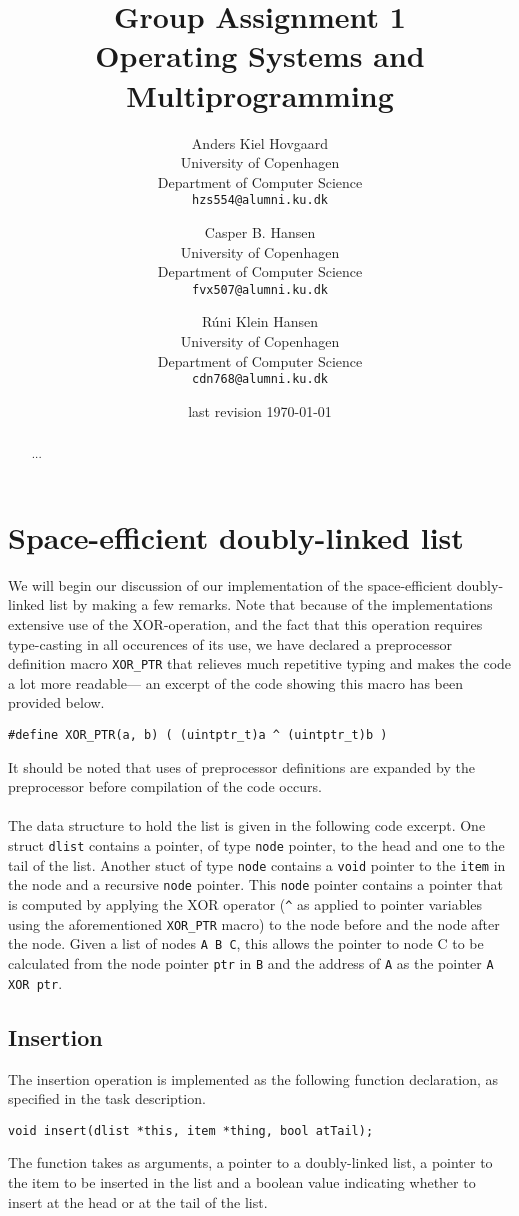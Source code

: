 \documentclass[11pt]{article}
\title
{
    {\Large Group Assignment 1} \\
    Operating Systems and Multiprogramming
}
\author
{
    Anders Kiel Hovgaard \\
    University of Copenhagen \\
    Department of Computer Science \\
    {\tt hzs554@alumni.ku.dk}
    \and
    Casper B. Hansen \\
    University of Copenhagen \\
    Department of Computer Science \\
    {\tt fvx507@alumni.ku.dk}
    \and
    Rúni Klein Hansen \\
    University of Copenhagen \\
    Department of Computer Science \\
    {\tt cdn768@alumni.ku.dk}
}
\date{last revision \today}
\newcommand{\code}[1]{{\tt #1}}
\begin{document}
\clearpage
\maketitle
\thispagestyle{empty}
\begin{multicols}{2}
    \begin{abstract}
    ...
    \end{abstract}
    \vfill\columnbreak
    \tableofcontents\vfill
\end{multicols}
\newpage

\section{Space-efficient doubly-linked list}
We will begin our discussion of our implementation of the space-efficient
doubly-linked list by making a few remarks. Note that because of the
implementations extensive use of the XOR-operation, and the fact that this
operation requires type-casting in all occurences of its use, we have declared
a preprocessor definition macro \code{XOR\_PTR} that relieves much repetitive
typing and makes the code a lot more readable--- an excerpt of the code
showing this macro has been provided below.

\begin{lstlisting}
#define XOR_PTR(a, b) ( (uintptr_t)a ^ (uintptr_t)b )
\end{lstlisting}

It should be noted that uses of preprocessor definitions are expanded by the
preprocessor before compilation of the code occurs.\\
\\
The data structure to hold the list is given in the following code excerpt. One
struct \code{dlist} contains a pointer, of type \code{node} pointer, to the head
and one to the tail of the list. Another stuct of type \code{node} contains a
\code{void} pointer to the \code{item} in the node and a recursive \code{node}
pointer. This \code{node} pointer contains a pointer that is computed by
applying the XOR operator (\lstinline{^} as applied to pointer variables using
the aforementioned \lstinline{XOR_PTR} macro) to the node before and the node
after the node. Given a list of nodes \verb|A B C|, this allows the pointer to
node C to be calculated from the node pointer \code{ptr} in \verb|B| and the
address of \verb|A| as the pointer \code{A XOR ptr}.


\subsection{Insertion}
The insertion operation is implemented as the following function declaration, as
specified in the task description.
\begin{lstlisting}
void insert(dlist *this, item *thing, bool atTail);
\end{lstlisting}
The function takes as arguments, a pointer to a doubly-linked list, a pointer to
the item to be inserted in the list and a boolean value indicating whether to
insert at the head or at the tail of the list.
\end{document}
